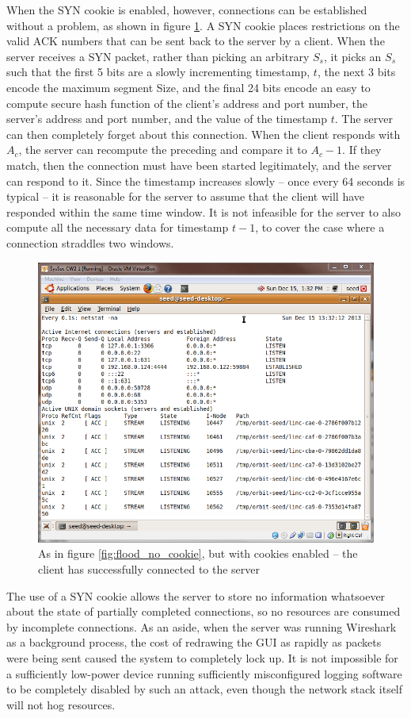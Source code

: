 When the SYN cookie is enabled, however, connections can be established without a problem, as shown in figure
\ref{fig:flood_with_cookie}. A SYN cookie places restrictions on the valid ACK numbers that can be sent back to the
server by a client. When the server receives a SYN packet, rather than picking an arbitrary $S_s$, it picks an $S_s$
such that the first 5 bits are a slowly incrementing timestamp, $t$, the next 3 bits encode the maximum segment Size,
and the final 24 bits encode an easy to compute secure hash function of the client's address and port number, the
server's address and port number, and the value of the timestamp $t$. The server can then completely forget about this
connection. When the client responds with $A_c$, the server can recompute the preceding and compare it to $A_c-1$. If
they match, then the connection must have been started legitimately, and the server can respond to it. Since the
timestamp increases slowly -- once every 64 seconds is typical -- it is reasonable for the server to
assume that the client will have responded within the same time window. It is not infeasible for the server to also
compute all the necessary data for timestamp $t-1$, to cover the case where a connection straddles two windows.

\begin{figure}[h]
    \centering \includegraphics[width=.7\linewidth]{images/syn_flood_cookie.png}
    \caption{As in figure \ref{fig:flood_no_cookie}, but with cookies enabled -- the client has successfully connected to
    the server}
    \label{fig:flood_with_cookie}
\end{figure}

The use of a SYN cookie allows the server to store no information whatsoever about the state of partially completed
connections, so no resources are consumed by incomplete connections. As an aside, when the server was running Wireshark
as a background process, the cost of redrawing the GUI as rapidly as packets were being sent caused the system to
completely lock up. It is not impossible for a sufficiently low-power device running sufficiently misconfigured logging
software to be completely disabled by such an attack, even though the network stack itself will not hog resources.


